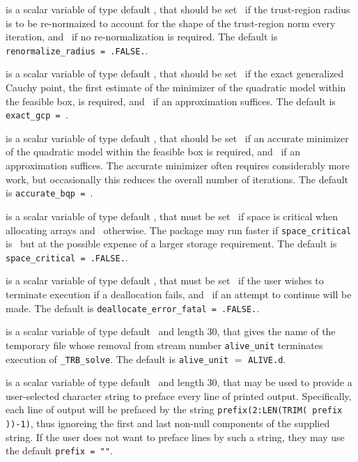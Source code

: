 \documentclass{galahad}
\newcommand{\packagename}{TRB}
\newcommand{\fullpackagename}{\libraryname\_\packagename}
\newcommand{\solver}{{\tt \fullpackagename\_solve}}
\begin{document}
\begin{description}
is a scalar variable of type default \logical,
that should be set \true\ if the trust-region radius is to be
re-normaized to account for the shape of the trust-region norm
every iteration, and \false\ if no re-normalization is required.
The default is {\tt renormalize\_radius = .FALSE.}.


 is a scalar variable of type default \logical, that should
be set \true\ if the exact generalized Cauchy point,
the first estimate of the minimizer of the quadratic model within
the feasible box, is required, and \false\ if an approximation suffices.
The default is {\tt exact\_gcp = \true}.

 is a scalar variable of type default \logical, that should
be set \true\ if an accurate minimizer of the
quadratic model within the feasible box is required, and
\false\ if an approximation suffices. The accurate minimizer often
requires considerably more work, but occasionally this reduces the overall
number of iterations.
The default is {\tt accurate\_bqp = \false}.

 is a scalar variable of type default \logical,
that must be set \true\ if space is critical when allocating arrays
and  \false\ otherwise. The package may run faster if
{\tt space\_critical} is \false\ but at the possible expense of a larger
storage requirement. The default is {\tt space\_critical = .FALSE.}.

 is a scalar variable of type default \logical,
that must be set \true\ if the user wishes to terminate execution if
a deallocation  fails, and \false\ if an attempt to continue
will be made. The default is {\tt deallocate\_error\_fatal = .FALSE.}.

 is a scalar variable of type default \character\ and length
30, that gives the name of the temporary file whose removal from stream number
{\tt alive\_unit} terminates execution of \solver.
The default is {\tt alive\_unit} $=$ {\tt ALIVE.d}.

 is a scalar variable of type default \character\
and length 30, that may be used to provide a user-selected
character string to preface every line of printed output.
Specifically, each line of output will be prefaced by the string
{\tt prefix(2:LEN(TRIM( prefix ))-1)},
thus ignoreing the first and last non-null components of the
supplied string. If the user does not want to preface lines by such
a string, they may use the default {\tt prefix = ""}.


\end{description}
\end{document}
